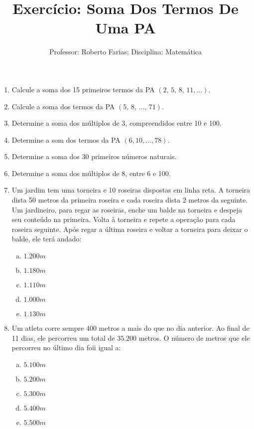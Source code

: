 \documentclass[a4paper,12pt, twocolumn]{article}
\begin{document}
\title{Exercício: Soma Dos Termos De Uma PA}
\author{Professor: Roberto Farias; Disciplina: Matemática}
\date{}
\maketitle
\pagestyle{empty}

\begin{enumerate}[1°)]
	\item Calcule a soma dos 15 primeiros termos da PA $\left(2, \,5, \,8, \,11, ... \right)$.
	\item Calcule a soma dos termos da PA $\left(5, \,8, \,..., \,71 \right)$.
	\item Determine a soma dos múltiplos de 3, compreendidos entre 10 e 100.
	\item Determine a som dos termos da PA $\left(6,10,...,78 \right)$.
	\item Determine a soma dos 30 primeiros números naturais.
	\item Determine a soma dos múltiplos de 8, entre 6 e 100.
	\item Um jardim tem uma torneira e 10 roseiras dispostas em linha reta. A torneira dista 50 metros da primeira roseira e cada roseira dista 2 metros da seguinte. Um jardineiro, para regar as roseiras, enche um balde na torneira e despeja seu conteúdo na primeira. Volta à torneira e repete a operação para cada roseira seguinte. Após regar a última roseira e voltar a torneira para deixar o balde, ele terá andado:
	\begin{enumerate}[a)]
		\item $1.200 m$
		\item $1.180 m$
		\item $1.110 m$
		\item $1.000 m$
		\item $1.130 m$
	\end{enumerate}
	\item Um atleta corre sempre 400 metros a mais do que no dia anterior. Ao final de 11 dias, ele percorreu um total de $35.200$ metros. O número de metros que ele percorreu no último dia foii igual a:
	\begin{enumerate}[a)]
		\item $5.100 m$
		\item $5.200 m$
		\item $5.300 m$
		\item $5.400 m$
		\item $5.500 m$
	\end{enumerate}

\end{enumerate}
\end{document}
